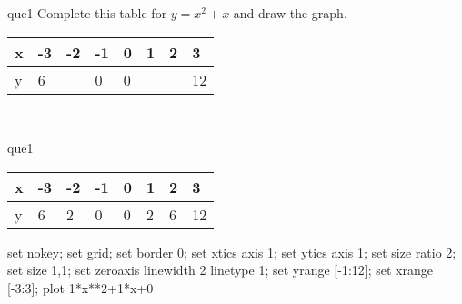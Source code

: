 \documentclass[13.5pt, varwidth=true]{beamer}
\begin{document}
\begin{frame}[shrink=19,fragile]
	\begin{beamercolorbox}[rounded=true, left, shadow=true,wd=14.8cm]{que1}
		 Complete this table for $y = x^{2} + x$ and draw the graph. \\[0.3cm] \renewcommand{\arraystretch}{1.2}\begin{tabular}{|C|C|C|C|C|C|C|C|} \hline x & -3 & -2 & -1 & 0 & 1 & 2 & 3 \\ \hline y & 6 &  & 0 & 0 &  &  & 12\\ \hline \end{tabular}\\[0.3cm]
	\end{beamercolorbox}
\end{frame}
\begin{frame}[shrink=19,fragile]
	\begin{beamercolorbox}[rounded=true, left, shadow=true,wd=14.8cm]{que1}
		\renewcommand{\arraystretch}{1.2}\begin{tabular}{|C|C|C|C|C|C|C|C|} \hline x & -3 & -2 & -1 & 0 & 1 & 2 & 3 \\ \hline y & 6 & 2 & 0 & 0 & 2 & 6 & 12\\ \hline \end{tabular}\begin{gnuplot}[terminal=pdf] set nokey; set grid; set border 0; set xtics axis 1; set ytics axis 1; set size ratio 2; set size 1,1; set zeroaxis linewidth 2 linetype 1; set yrange [-1:12]; set xrange [-3:3]; plot 1*x**2+1*x+0 \end{gnuplot}
	\end{beamercolorbox}
\end{frame}
\end{document}

